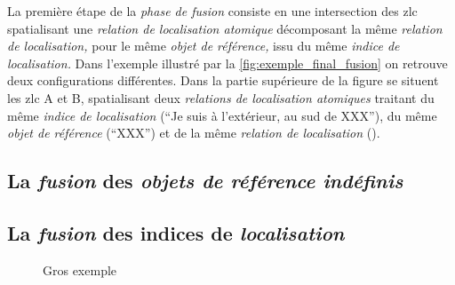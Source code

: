 La première étape de la \emph{phase de fusion} consiste en une
intersection des \ac{zlc} spatialisant une \emph{relation de
  localisation atomique} décomposant la même \emph{relation de
  localisation,} pour le même \emph{objet de référence,} issu du même
\emph{indice de localisation.} Dans l'exemple illustré par la
\autoref{fig:exemple_final_fusion} on retrouve deux configurations
différentes. Dans la partie supérieure de la figure se situent les
\ac{zlc} \textcolor{RdBu-9-1}{\textsf{A}} et
\textcolor{RdBu-9-3}{\textsf{B}}, spatialisant deux \emph{relations de
  localisation atomiques} traitant du même \emph{indice de
  localisation} (\enquote{Je suis à l'extérieur, au sud de XXX}), du
même \emph{objet de référence} (\enquote{XXX}) et de la même
\emph{relation de localisation}
().

\subsection{La \emph{fusion} des \emph{objets de référence indéfinis}}

\subsection{La \emph{fusion} des indices de \emph{localisation}}


\begin{landscape}
  \begin{figure}[H]
    \centering
    
    \caption{Gros exemple}
    \label{fig:exemple_final_fusion}
  \end{figure}
\end{landscape}


